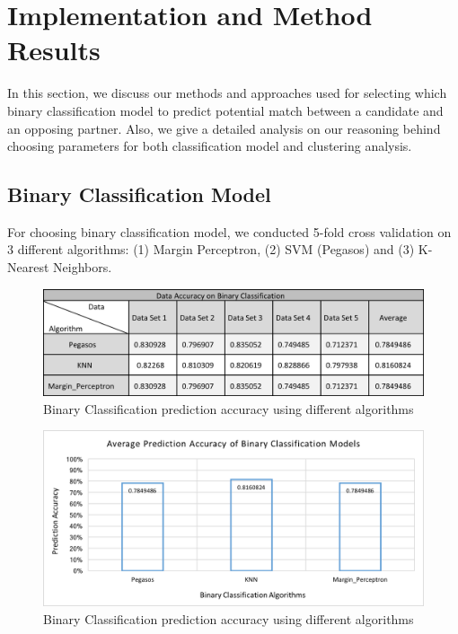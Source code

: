 \documentclass[11pt,letterpaper]{article}
\begin{document}
\section{Implementation and Method Results}

In this section, we discuss our methods and approaches used for selecting which binary classification model to predict potential match between a candidate and an opposing partner. Also, we give a detailed analysis on our reasoning behind choosing parameters for both classification model and clustering analysis.

\subsection{Binary Classification Model}

For choosing binary classification model, we conducted 5-fold cross validation on 3 different algorithms: (1) Margin Perceptron, (2) SVM (Pegasos) and (3) K-Nearest Neighbors.

\begin{figure}
  \includegraphics[width=\linewidth]{data_1.png}
  \caption{Binary Classification prediction accuracy using different algorithms}
  \label{fig:table1}
\end{figure}

\begin{figure}
  \includegraphics[width=\linewidth]{1_Raw_Binary_Classification.png}
  \caption{Binary Classification prediction accuracy using different algorithms}
  \label{fig:graph1}
\end{figure}
\end{document}
